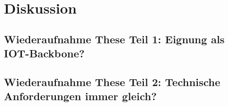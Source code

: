 \chapter{Diskussion}
\label{ch:discussion}
\lipsum[1-1]

%
%
\section{Wiederaufnahme These Teil 1: Eignung als IOT-Backbone?}
\label{sec:discussion:part1}
\lipsum[1-1]

%
%
\section{Wiederaufnahme These Teil 2: Technische Anforderungen immer gleich?}
\label{sec:discussion:part2}
\lipsum[1-1]
